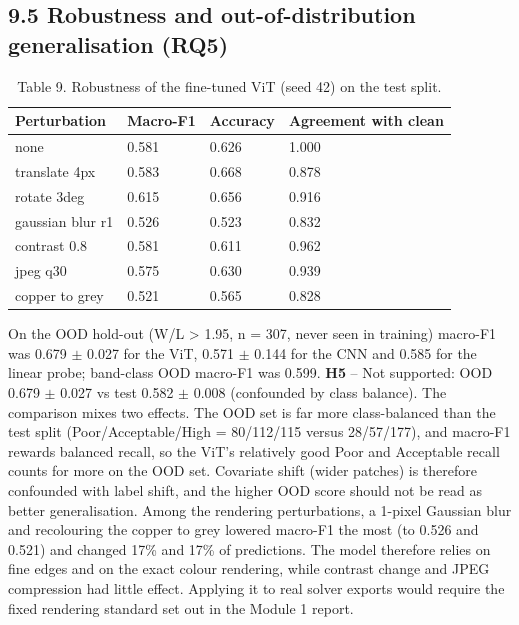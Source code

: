 \documentclass[11pt,a4paper]{article}
\begin{document}
\subsection*{9.5 Robustness and out-of-distribution generalisation (RQ5)}
\begin{table}[H]\centering\small
\caption*{Table 9. Robustness of the fine-tuned ViT (seed 42) on the test split.}
\begin{tabularx}{\linewidth}{XXXX}
\toprule
\textbf{Perturbation} & \textbf{Macro-F1} & \textbf{Accuracy} & \textbf{Agreement with clean} \\
\midrule
none & 0.581 & 0.626 & 1.000 \\
translate 4px & 0.583 & 0.668 & 0.878 \\
rotate 3deg & 0.615 & 0.656 & 0.916 \\
gaussian blur r1 & 0.526 & 0.523 & 0.832 \\
contrast 0.8 & 0.581 & 0.611 & 0.962 \\
jpeg q30 & 0.575 & 0.630 & 0.939 \\
copper to grey & 0.521 & 0.565 & 0.828 \\
\bottomrule
\end{tabularx}
\end{table}
On the OOD hold-out (W/L > 1.95, n = 307, never seen in training) macro-F1 was 0.679 $\pm$ 0.027 for the ViT, 0.571 $\pm$ 0.144 for the CNN and 0.585 for the linear probe; band-class OOD macro-F1 was 0.599. \textbf{H5} -- Not supported: OOD 0.679 $\pm$ 0.027 vs test 0.582 $\pm$ 0.008 (confounded by class balance). The comparison mixes two effects. The OOD set is far more class-balanced than the test split (Poor/Acceptable/High = 80/112/115 versus 28/57/177), and macro-F1 rewards balanced recall, so the ViT's relatively good Poor and Acceptable recall counts for more on the OOD set. Covariate shift (wider patches) is therefore confounded with label shift, and the higher OOD score should not be read as better generalisation. Among the rendering perturbations, a 1-pixel Gaussian blur and recolouring the copper to grey lowered macro-F1 the most (to 0.526 and 0.521) and changed 17\% and 17\% of predictions. The model therefore relies on fine edges and on the exact colour rendering, while contrast change and JPEG compression had little effect. Applying it to real solver exports would require the fixed rendering standard set out in the Module 1 report.
\end{document}

